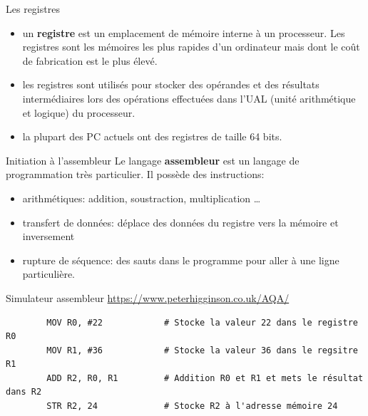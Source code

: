 \def\level{Première}  %
\def\course{NSI}
\def\chaptername{La langage assembleur} %
\def\docname{ARSE01-TP1}        %

\pagestyle{cours_FP}
\makeheader{} %

\begin{easybox}{Les registres}{}

    \begin{itemize}
        \item un \textbf{registre} est un emplacement de mémoire interne à un processeur. Les registres sont les mémoires les plus rapides d'un ordinateur mais dont le coût de fabrication est le plus élevé.
        \item les registres sont utilisés pour stocker des opérandes et des résultats intermédiaires lors des opérations effectuées dans l'UAL (unité arithmétique et logique) du processeur.
        \item la plupart des PC actuels ont des registres de taille 64 bits.
    \end{itemize}

        
\end{easybox}


\begin{easybox}{Initiation à l'assembleur}{}
	Le langage \textbf{assembleur} est un langage de programmation très particulier. Il possède des instructions:
	\begin{itemize}
		\item arithmétiques: addition, soustraction, multiplication \ldots
		\item transfert de données: déplace des données du registre vers la mémoire et inversement
		\item rupture de séquence: des sauts dans le programme pour aller à une ligne particulière.
	\end{itemize}
\end{easybox}

\begin{easybox}{Simulateur assembleur}{}
	 \href{https://www.peterhigginson.co.uk/AQA/}{https://www.peterhigginson.co.uk/AQA/}
\end{easybox}



\begin{exemple}{}
	\begin{verbatim}
		MOV R0, #22            # Stocke la valeur 22 dans le registre R0
		MOV R1, #36            # Stocke la valeur 36 dans le regsitre R1
		ADD R2, R0, R1         # Addition R0 et R1 et mets le résultat dans R2
		STR R2, 24             # Stocke R2 à l'adresse mémoire 24
	\end{verbatim}
\end{exemple}

